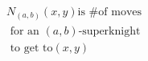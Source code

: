 \documentclass[preview]{standalone}
\begin{document}
\begin{align*}
{N_{(a,b)}(x,y)} \text{is } \# \text{of moves} \\ \text{ for an }(a,b)\text{-superknight} \\ \text{ to get to} (x,y)
\end{align*}
\end{document}
